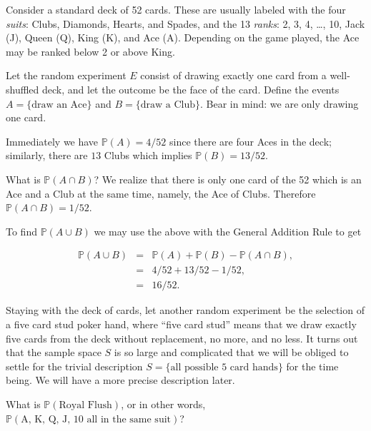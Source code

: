 \documentclass[]{book}
\numberwithin{equation}{chapter}
\numberwithin{figure}{chapter}
\theoremstyle{plain}
\theoremstyle{definition}
\theoremstyle{remark}
\theoremstyle{definition}
\theoremstyle{definition}
\theoremstyle{remark}
\let\BeginKnitrBlock\begin \let\EndKnitrBlock\end
\begin{document}
\bigskip

\BeginKnitrBlock{example}
\protect\hypertarget{ex:unnamed-chunk-126}{}{\label{ex:unnamed-chunk-126}}Consider
a standard deck of 52 cards. These are usually labeled with the four
\emph{suits}: Clubs, Diamonds, Hearts, and Spades, and the 13
\emph{ranks}: 2, 3, 4, \ldots{}, 10, Jack (J), Queen (Q), King (K), and
Ace (A). Depending on the game played, the Ace may be ranked below 2 or
above King.
\EndKnitrBlock{example}

Let the random experiment \(E\) consist of drawing exactly one card from
a well-shuffled deck, and let the outcome be the face of the card.
Define the events \(A = \{ \mbox{draw an Ace} \}\) and
\(B = \{ \mbox{draw a Club} \}\). Bear in mind: we are only drawing one
card.

Immediately we have \(\mathbb{P}(A) = 4/52\) since there are four Aces
in the deck; similarly, there are \(13\) Clubs which implies
\(\mathbb{P}(B) = 13/52\).

What is \(\mathbb{P}(A\cap B)\)? We realize that there is only one card
of the 52 which is an Ace and a Club at the same time, namely, the Ace
of Clubs. Therefore \(\mathbb{P}(A\cap B)=1/52\).

To find \(\mathbb{P}(A\cup B)\) we may use the above with the General
Addition Rule to get

\begin{eqnarray*}
\mathbb{P}(A\cup B) & = & \mathbb{P}(A) + \mathbb{P}(B) - \mathbb{P}(A \cap B),\\
 & = & 4/52 + 13/52 - 1/52,\\
 & = & 16/52.
\end{eqnarray*}

\bigskip

\BeginKnitrBlock{example}
\protect\hypertarget{ex:unnamed-chunk-127}{}{\label{ex:unnamed-chunk-127}}Staying
with the deck of cards, let another random experiment be the selection
of a five card stud poker hand, where ``five card stud'' means that we
draw exactly five cards from the deck without replacement, no more, and
no less. It turns out that the sample space \(S\) is so large and
complicated that we will be obliged to settle for the trivial
description \(S = \{ \mbox{all possible 5 card hands} \}\) for the time
being. We will have a more precise description later.
\EndKnitrBlock{example}

What is \(\mathbb{P}(\mbox{Royal Flush})\), or in other words,
\(\mathbb{P}(\mbox{A, K, Q, J, 10 all in the same suit})\)?
\end{document}
